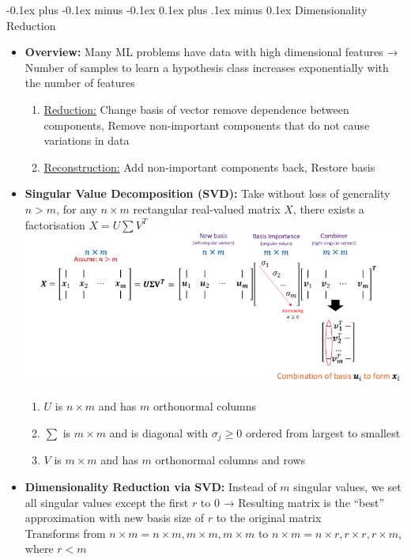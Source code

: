 \documentclass[landscape]{article}
\makeatletter
\renewcommand{\subsection}{\@startsection{subsection}{2}{0mm}%
  {-0.1ex plus -0.1ex minus -0.1ex}%
  {0.1ex plus .1ex minus 0.1ex}%
{\normalfont\scriptsize\bfseries}}
\makeatother
\begin{document}
\begin{multicols*}{5}
        \subsection{Dimensionality Reduction}
        \begin{itemize}
          \item \textbf{Overview:} Many ML problems have data with high dimensional features → Number of samples to learn a hypothesis class increases exponentially with the number of features
          \begin{enumerate}
            \item \underline{Reduction:} Change basis of vector remove dependence between components, Remove non-important components that do not cause variations in data
            \item \underline{Reconstruction:} Add non-important components back, Restore basis
          \end{enumerate}
          \item \textbf{Singular Value Decomposition (SVD):} Take without loss of generality $n > m$, for any $n \times m$ rectangular real-valued matrix $X$, there exists a factorisation $X = U\sum V^T$
          \includegraphics[width=0.95\linewidth]{29_SVD.png}
          \begin{enumerate}
            \item $U$ is $n \times m$ and has $m$ orthonormal columns
            \item $\sum$ is $m \times m$ and is diagonal with $\sigma_j \geq 0$ ordered from largest to smallest
            \item $V$ is $m \times m$ and has $m$ orthonormal columns and rows
          \end{enumerate}
          \item \textbf{Dimensionality Reduction via SVD:} Instead of $m$ singular values, we set all singular values except the first $r$ to 0 → Resulting matrix is the “best” approximation with new basis size of $r$ to the original matrix \\ Transforms from $n \times m = n \times m, m \times m, m \times m$ to $n \times m = n \times r, r \times r, r \times m$, where $r < m$

\end{itemize}
\end{multicols*}
\end{document}
